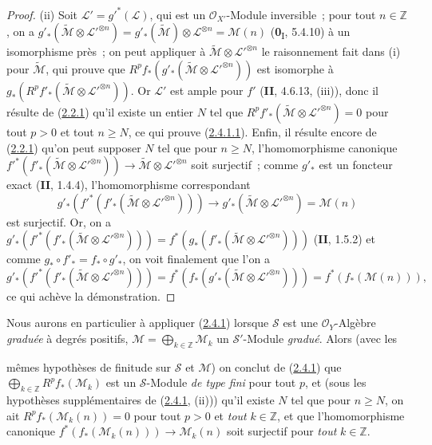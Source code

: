 \begin{proof}
(ii) Soit $\mathcal L'=g'^*(\mathcal L)$, qui est un
$\mathcal O_{X'}$-Module inversible~; pour tout $n\in\mathbb Z$, on a
$g'_*(\widetilde{\mathcal M}\otimes\mathcal L'^{\otimes n})
=g'_*(\widetilde{\mathcal M})\otimes\mathcal L^{\otimes n}
=\mathcal M(n)$
(\textbf{0}\textsubscript{I}, 5.4.10) à un isomorphisme près~; on peut appliquer
à $\widetilde{\mathcal M}\otimes\mathcal L'^{\otimes n}$ le
raisonnement fait dans (i) pour $\widetilde{\mathcal M}$, qui prouve que
$R^pf_*(g'_*(\widetilde{\mathcal M}\otimes\mathcal L'^{\otimes n}))$
est isomorphe à
$g_*(R^pf'_*(\widetilde{\mathcal M}\otimes\mathcal L'^{\otimes n}))$.
Or $\mathcal L'$ est ample pour $f'$ (\textbf{II}, 4.6.13, (iii)), donc il résulte
de (\hyperref[III.2.2.1-fr]{2.2.1}) qu'il existe un entier $N$ tel que
$R^pf'_*(\widetilde{\mathcal M}\otimes\mathcal L'^{\otimes n})=0$
pour tout $p>0$ et tout $n\geq N$, ce qui prouve
(\hyperref[III.2.4.1.1-fr]{2.4.1.1}). Enfin, il résulte encore de
(\hyperref[III.2.2.1-fr]{2.2.1}) qu'on peut supposer $N$ tel que pour
$n\geq N$, l'homomorphisme canonique
$f'^*(f'_*(\widetilde{\mathcal M}\otimes\mathcal L'^{\otimes n}))
\longrightarrow\widetilde{\mathcal M}\otimes\mathcal L'^{\otimes n}$
soit surjectif~; comme $g'_*$ est un foncteur exact (\textbf{II}, 1.4.4),
l'homomorphisme correspondant
\[
g'_*(f'^*(f'_*(\widetilde{\mathcal M}\otimes
\mathcal L'^{\otimes n})))
\longrightarrow
g'_*(\widetilde{\mathcal M}\otimes\mathcal L'^{\otimes n})
=\mathcal M(n)
\]
est surjectif. Or, on a
$g'_*(f'^*(f'_*(\widetilde{\mathcal M}\otimes
\mathcal L'^{\otimes n})))
=f^*(g_*(f'_*(\widetilde{\mathcal M}\otimes
\mathcal L'^{\otimes n})))$
(\textbf{II}, 1.5.2) et comme $g_*\circ f'_* = f_*\circ g'_*$, on voit
finalement que l'on a
\[
g'_*(f'^*(f'_*(\widetilde{\mathcal M}\otimes\mathcal L'^{\otimes n})))
=f^*(f_*(g'_*(\widetilde{\mathcal M}\otimes
\mathcal L'^{\otimes n})))=f^*(f_*(\mathcal M(n))),
\]
ce qui achève la démonstration.
\end{proof}

\begin{env}[2.4.2]
\label{III.2.4.2-fr}
Nous aurons en particulier à appliquer
(\hyperref[III.2.4.1-fr]{2.4.1}) lorsque $\mathcal S$ est une
$\mathcal O_Y$-Algèbre \emph{graduée} à degrés positifs,
$\mathcal M=\bigoplus_{k\in\mathbb Z}\mathcal M_k$ un
$\mathcal S'$-Module \emph{gradué}. Alors (avec les

mêmes hypothèses de finitude sur $\mathcal S$ et $\mathcal M$) on conclut
de (\hyperref[III.2.4.1-fr]{2.4.1}) que
$\bigoplus_{k\in\mathbb Z}R^pf_*(\mathcal M_k)$
est un $\mathcal S$-Module \emph{de type fini} pour tout $p$, et (sous les
hypothèses supplémentaires de (\hyperref[III.2.4.1-fr]{2.4.1}, (ii)))
qu'il existe $N$ tel que pour $n\geq N$, on ait
$R^pf_*(\mathcal M_k(n))=0$ pour tout $p>0$ et \emph{tout} $k\in\mathbb Z$, et
que l'homomorphisme canonique
$f^*(f_*(\mathcal M_k(n)))\to\mathcal M_k(n)$ soit surjectif pour \emph{tout}
$k\in\mathbb Z$.
\end{env}

